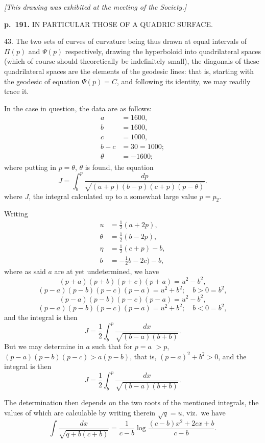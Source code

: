 \documentclass[11pt,a4paper]{article}
\begin{document}
\rule{0pt}{0pt} \hfill {\footnotesize\textit{[This drawing was exhibited at the meeting of the Society.]}}

\clearpage

\noindent
\textbf{p.~191.}  IN PARTICULAR THOSE OF A QUADRIC SURFACE.

43. The two sets of curves of curvature being thus drawn at equal intervals of $\Pi(p)$ and $\Psi(p)$ respectively, drawing the hyperboloid into quadrilateral spaces (which of course should theoretically be indefinitely small), the diagonals of these quadrilateral spaces are the elements of the geodesic lines: that is, starting with the geodesic of equation $\Psi(p) = C$, and following its identity, we may readily trace it.

In the case in question, the data are as follows:
\begin{align*}
a &= 1600, \\
b &= 1600, \\
c &= 1000, \\
b - c &= 30 = 1000; \\
\theta &= -1600;
\end{align*}
where putting in $p = \theta$, $\theta$ is found, the equation
\[
J = \int_b^{p} \frac{dp}{\sqrt{(a + p)(b - p)(c + p)(p - \theta)}}.
\]
where $J$, the integral calculated up to a somewhat large value $p = p_2$.

Writing
\begin{align*}
u &= \tfrac{1}{2}(a + 2p), \\
\theta &= \tfrac{1}{2}(b - 2p), \\
\eta &= \tfrac{1}{2}(c + p) - b, \\
b &= -\tfrac{1}{2}b - 2c) - b,
\end{align*}
where as said $a$ are at yet undetermined, we have
\[
(p + a)(p + b)(p + c)(p + a) = u^2 - b^2,
\]
\[
(p - a)(p - b)(p - c)(p - a) = u^2 + b^2; \quad b > 0 = b^2,
\]
\[
(p - a)(p - b)(p - c)(p - a) = u^2 - b^2,
\]
\[
(p - a)(p - b)(p - c)(p - a) = u^2 + b^2; \quad b < 0 = b^2,
\]
and the integral is then
\[
J = \frac{1}{2}\int_b^{p} \frac{dx}{\sqrt{(b - a)(b + b)}}.
\]
But we may determine in $a$ such that for $p = a$ $> p$, $(p - a)(p - b)(p - c) > a (p - b)$, that is, $(p - a)^2 + b^2 > 0$, and the integral is then
\[
J = \frac{1}{2}\int_b^{p} \frac{dx}{\sqrt{(b - a)(b + b)}}.
\]

The determination then depends on the two roots of the mentioned integrals, the values of which are calculable by writing therein $\sqrt{q} = u$, viz.\ we have
\[
\int \frac{dx}{\sqrt{q + b(c + b)}} = \frac{1}{c - b} \log \frac{(c - b)x^2 + 2cx + b}{c - b}.
\]
\end{document}
